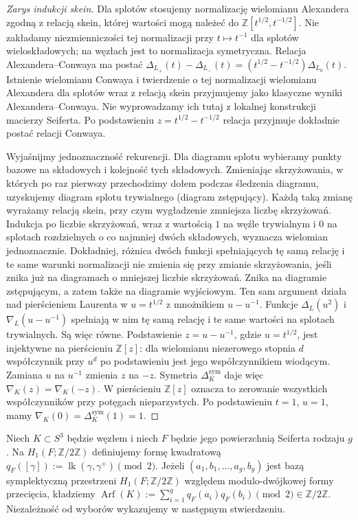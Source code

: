 \begin{proof}[Zarys indukcji skein]
Dla splotów stosujemy normalizację wielomianu
Alexandera zgodną z relacją skein, której wartości
mogą należeć do $\mathbb Z[t^{1/2},t^{-1/2}]$.
Nie zakładamy niezmienniczości tej normalizacji
przy $t\mapsto t^{-1}$ dla splotów wieloskładowych;
na węzłach jest to normalizacja symetryczna. Relacja
Alexandera--Conwaya ma postać
$\Delta_{L_+}(t)-\Delta_{L_-}(t)=
(t^{1/2}-t^{-1/2})\Delta_{L_0}(t)$.
Istnienie wielomianu Conwaya i twierdzenie o tej
normalizacji wielomianu Alexandera dla splotów wraz
z relacją skein przyjmujemy jako klasyczne wyniki
Alexandera--Conwaya. Nie wyprowadzamy ich tutaj
z lokalnej konstrukcji macierzy Seiferta. Po podstawieniu
$z=t^{1/2}-t^{-1/2}$ relacja przyjmuje dokładnie
postać relacji Conwaya.

Wyjaśnijmy jednoznaczność rekurencji. Dla diagramu splotu
wybieramy punkty bazowe na składowych i kolejność tych
składowych. Zmieniając skrzyżowania, w których po raz
pierwszy przechodzimy dołem podczas śledzenia diagramu,
uzyskujemy diagram splotu trywialnego (diagram zstępujący). Każdą taką zmianę
wyrażamy relacją skein, przy czym wygładzenie zmniejsza
liczbę skrzyżowań. Indukcja po liczbie skrzyżowań, wraz
z wartością $1$ na węźle trywialnym i $0$ na splotach
rozdzielnych o co najmniej dwóch składowych, wyznacza
wielomian jednoznacznie. Dokładniej, różnica dwóch
funkcji spełniających tę samą relację i te same warunki
normalizacji nie zmienia się przy zmianie skrzyżowania,
jeśli znika już na diagramach o mniejszej liczbie
skrzyżowań. Znika na diagramie zstępującym, a zatem
także na diagramie wyjściowym. Ten sam argument działa
nad pierścieniem Laurenta w $u=t^{1/2}$ z mnożnikiem
$u-u^{-1}$. Funkcje $\Delta_L(u^2)$ i $\nabla_L(u-u^{-1})$
spełniają w nim tę samą relację i te same wartości
na splotach trywialnych. Są więc równe. Podstawienie $z=u-u^{-1}$, gdzie $u=t^{1/2}$,
jest injektywne na pierścieniu $\mathbb Z[z]$:
dla wielomianu niezerowego stopnia $d$ współczynnik
przy $u^d$ po podstawieniu jest jego współczynnikiem
wiodącym. Zamiana $u$ na $u^{-1}$ zmienia $z$ na $-z$.
Symetria $\Delta_K^{\mathrm{sym}}$ daje więc
$\nabla_K(z)=\nabla_K(-z)$. W pierścieniu
$\mathbb Z[z]$ oznacza to zerowanie wszystkich
współczynników przy potęgach nieparzystych.
Po podstawieniu $t=1$, $u=1$, mamy
$\nabla_K(0)=\Delta_K^{\mathrm{sym}}(1)=1$.
\end{proof}

\begin{definicja}
Niech $K\subset S^3$ będzie węzłem i niech
$F$ będzie jego powierzchnią Seiferta rodzaju $g$.
Na $H_1(F;\mathbb Z/2\mathbb Z)$ definiujemy
formę kwadratową $q_F([\gamma]):=
\operatorname{lk}(\gamma,\gamma^+)\pmod2$.
Jeżeli $(a_1,b_1,\dots,a_g,b_g)$ jest bazą symplektyczną
przestrzeni $H_1(F;\mathbb Z/2\mathbb Z)$ względem
modulo-dwójkowej formy przecięcia, kładziemy
$\operatorname{Arf}(K):=\sum_{i=1}^{g}q_F(a_i)q_F(b_i)
\pmod2\in\mathbb Z/2\mathbb Z$.
Niezależność od wyborów wykazujemy w następnym stwierdzeniu.
\end{definicja}

